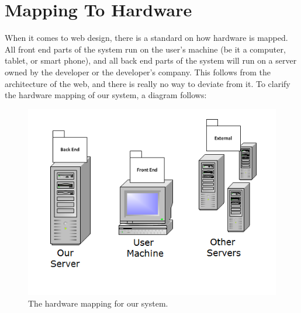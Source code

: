 \section{Mapping To Hardware}
When it comes to web design, there is a standard on how hardware is mapped. All front end parts of the system run on the user's machine (be it a computer, tablet, or smart phone), and all back end parts of the system will run on a server owned by the developer or the developer's company. This follows from the architecture of the web, and there is really no way to deviate from it. To clarify the hardware mapping of our system, a diagram follows:

\begin{figure}[H]
\centering
\includegraphics{./img/hardware.png}
\caption{The hardware mapping for our system.}
\end{figure}